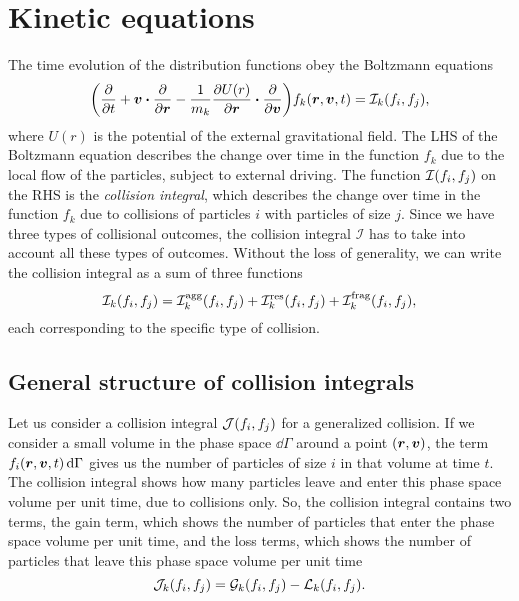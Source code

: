 \documentclass[aps,prl,preprint,groupedaddress,10pt]{revtex4-2}
\begin{document}
\section{Kinetic equations}
The time evolution of the distribution functions obey the Boltzmann equations
\begin{equation}\label{eq:kinetic_equation_generic}
    \pqty{\pdv{t}+\bv\vdot\pdv{\br}-\frac{1}{m_k}\pdv{U(r)}{\br}\vdot\pdv{\bv}}
    f_k\pqty{\br,\bv,t}=\mathcal{I}_k\pqty{f_i,f_j},
\end{equation}
where $U(r)$ is the potential of the external gravitational field. The LHS
of the Boltzmann equation describes the change over time in the function $f_k$ due to the
local flow of the particles, subject to external driving. The function
$\mathcal{I}\pqty{f_i,f_j}$ on the RHS is the \emph{collision integral}, which
describes the change over time in the function $f_k$ due to collisions of particles $i$
with particles of size $j$. Since we have three types of collisional outcomes, the
collision integral $\mathcal{I}$ has to take into account all these types of outcomes.
Without the loss of generality, we can write the collision integral as a sum of three
functions
\begin{equation}
    \mathcal{I}_k\pqty{f_i,f_j}=\utx{\mathcal{I}_k}{agg}\pqty{f_i,f_j}+
    \utx{\mathcal{I}_k}{res}\pqty{f_i,f_j}+\utx{\mathcal{I}_k}{frag}\pqty{f_i,f_j},
\end{equation}
each corresponding to the specific type of collision.

\subsection{General structure of collision integrals}
Let us consider a collision integral $\mathcal{J}\pqty{f_i,f_j}$ for a generalized
collision. If we consider a small volume in the phase space $\dd{\Gamma}$
around a point $\pqty{\br,\bv}$, the term $f_i\pqty{\br,\bv,t}\dd{\Gamma}$ gives us
the number of particles of size $i$ in that volume at time $t$. The collision integral
shows how many particles leave and enter this phase space volume per unit time, due
to collisions only. So, the collision integral contains two terms, the gain term, which
shows the number of particles that enter the phase space volume per unit time, and the
loss terms, which shows the number of particles that leave this phase space volume per
unit time
\begin{equation}
    \mathcal{J}_k\pqty{f_i,f_j}=\mathcal{G}_k\pqty{f_i,f_j}-\mathcal{L}_k\pqty{f_i,f_j}.
\end{equation}
\end{document}
